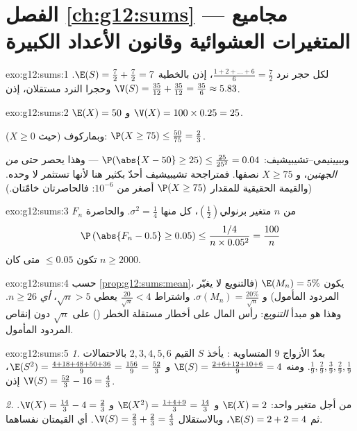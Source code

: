 \section*{الفصل \ref{ch:g12:sums} --- مجاميع المتغيرات العشوائية وقانون الأعداد الكبيرة}

\begin{solution}{exo:g12:sums:1}
لكل حجر نرد 
$\frac{1 + 2 + \dots + 6}{6} = \frac{7}{2}$، إذن بالخطية
$\E(S) = \frac72 + \frac72 = 7$. وحجرا النرد مستقلان، إذن
$\V(S) = \frac{35}{12} + \frac{35}{12} = \frac{35}{6} \approx 5.83$.
\end{solution}

\begin{solution}{exo:g12:sums:2}
$\E(X) = 50$ و $\V(X) = 100 \times 0.25 = 25$.

وبماركوف (حيث $X \geq 0$): $\P(X \geq 75) \leq \frac{50}{75} = \frac23$.

وببيينيمي--تشيبيشيف:
$\P(\abs{X - 50} \geq 25) \leq \frac{25}{25^2} = 0.04$ --- وهذا يحصر حتى
 \emph{من الجهتين}، و $X \geq 75$ نصفها. فمتراجحة تشيبيشيف
أحدّ بكثير هنا لأنها تستثمر  لا  وحده.
(والقيمة الحقيقية للمقدار $\P(X \geq 75)$ أصغر من $10^{-6}$: فالحاصرتان
خامّتان.)
\end{solution}

\begin{solution}{exo:g12:sums:3}
$F_n$   من $n$ متغير برنولي$\left(\frac12\right)$،
 كل منها $\sigma^2 = \frac14$. والحاصرة
\[
\P\left(\abs{F_n - 0.5} \geq 0.05\right)
\leq \frac{1/4}{n \times 0.05^2} = \frac{100}{n}
\]
تكون $\leq 0.05$ متى كان $n \geq 2000$.
\end{solution}

\begin{solution}{exo:g12:sums:4}
حسب \cref{prop:g12:sums:mean}، يكون $\E(M_n) = 5\%$ (فالتنويع لا
يغيّر المردود المأمول) و
$\sigma(M_n) = \frac{20\%}{\sqrt n}$. واشتراط
$\frac{20}{\sqrt n} < 4$ يعطي $\sqrt n > 5$، \emph{أي} $n \geq 26$.
وهذا هو مبدأ \emph{التنويع}:  رأس المال على
أخطار مستقلة  الخطر () على $\sqrt n$
دون إنقاص المردود المأمول.
\end{solution}

\begin{solution}{exo:g12:sums:5}
\emph{1.} بعدّ الأزواج $9$ المتساوية : يأخذ $S$ القيم
$2, 3, 4, 5, 6$ بالاحتمالات
$\frac19, \frac29, \frac39, \frac29, \frac19$. ومنه
$\E(S) = \frac{2 + 6 + 12 + 10 + 6}{9} = 4$ و
$\E(S^2) = \frac{4 + 18 + 48 + 50 + 36}{9} = \frac{156}{9} = \frac{52}{3}$،
إذن $\V(S) = \frac{52}{3} - 16 = \frac43$.

\emph{2.} من أجل متغير واحد: $\E(X) = 2$ و
$\E(X^2) = \frac{1 + 4 + 9}{3} = \frac{14}{3}$ و
$\V(X) = \frac{14}{3} - 4 = \frac23$. ثم $\E(S) = 2 + 2 = 4$، وبالاستقلال
$\V(S) = \frac23 + \frac23 = \frac43$. أي القيمتان نفساهما.
\end{solution}

